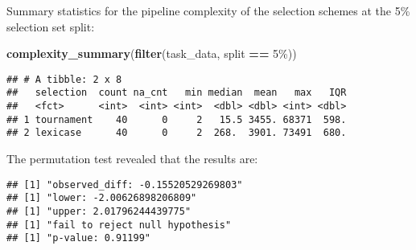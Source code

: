 \documentclass[
]{book}
\newenvironment{Shaded}{\begin{snugshade}}{\end{snugshade}}
\newcommand{\AttributeTok}[1]{\textcolor[rgb]{0.13,0.29,0.53}{#1}}
\newcommand{\DecValTok}[1]{\textcolor[rgb]{0.00,0.00,0.81}{#1}}
\newcommand{\FunctionTok}[1]{\textcolor[rgb]{0.13,0.29,0.53}{\textbf{#1}}}
\newcommand{\NormalTok}[1]{#1}
\newcommand{\OtherTok}[1]{\textcolor[rgb]{0.56,0.35,0.01}{#1}}
\newcommand{\SpecialCharTok}[1]{\textcolor[rgb]{0.81,0.36,0.00}{\textbf{#1}}}
\newcommand{\StringTok}[1]{\textcolor[rgb]{0.31,0.60,0.02}{#1}}
\begin{document}
Summary statistics for the pipeline complexity of the selection schemes at the 5\% selection set split:

\begin{Shaded}
\begin{Highlighting}[]
\FunctionTok{complexity\_summary}\NormalTok{(}\FunctionTok{filter}\NormalTok{(task\_data, split }\SpecialCharTok{==} \StringTok{\textquotesingle{}5\%\textquotesingle{}}\NormalTok{))}
\end{Highlighting}
\end{Shaded}

\begin{verbatim}
## # A tibble: 2 x 8
##   selection  count na_cnt   min median  mean   max   IQR
##   <fct>      <int>  <int> <int>  <dbl> <dbl> <int> <dbl>
## 1 tournament    40      0     2   15.5 3455. 68371  598.
## 2 lexicase      40      0     2  268.  3901. 73491  680.
\end{verbatim}

The permutation test revealed that the results are:

\begin{Shaded}
\end{Shaded}

\begin{verbatim}
## [1] "observed_diff: -0.15520529269803"
## [1] "lower: -2.00626898206809"
## [1] "upper: 2.01796244439775"
## [1] "fail to reject null hypothesis"
## [1] "p-value: 0.91199"
\end{verbatim}
\end{document}
